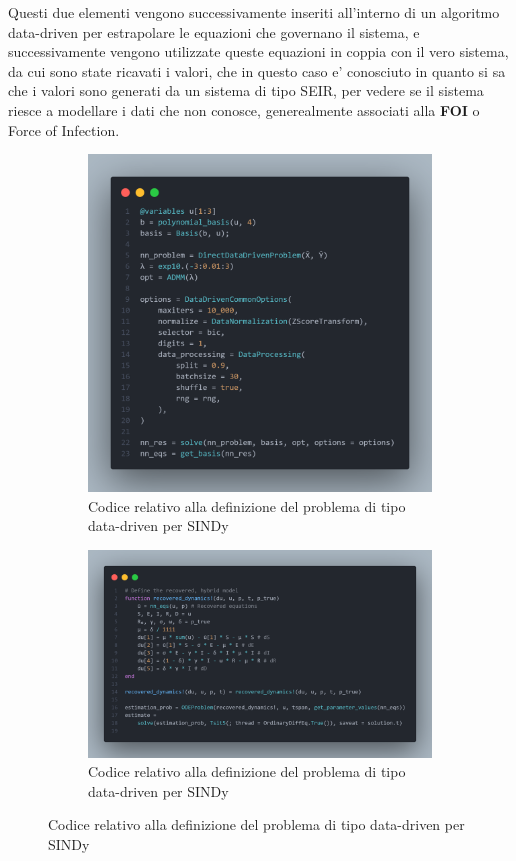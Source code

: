 Questi due elementi vengono successivamente inseriti all'interno di un algoritmo data-driven
per estrapolare le equazioni che governano il sistema, e successivamente vengono utilizzate 
queste equazioni in coppia con il vero sistema, da cui sono state ricavati i valori, 
che in questo caso e' conosciuto in quanto si sa che i valori sono generati da un sistema di tipo 
SEIR, per vedere se il sistema riesce a modellare i dati che non conosce, generealmente 
associati alla \textbf{FOI} o Force of Infection.

\begin{figure}[!hb]
	\centering
	\begin{subfigure}[b]{0.45\textwidth}
		\centering
		\includegraphics[width=\textwidth]{img/sindy_part_1.png}
		\caption{Codice relativo alla definizione del problema di tipo data-driven per SINDy}
		\label{fig:sindy_part_1}
	\end{subfigure}
	\hfill
	\begin{subfigure}[b]{0.45\textwidth}
		\centering
		\includegraphics[width=\textwidth]{img/sindy_part_2.png}
		\caption{Codice relativo alla definizione del problema di tipo data-driven per SINDy}
		\label{fig:sindy_part_2}
	\end{subfigure}
\end{figure}


